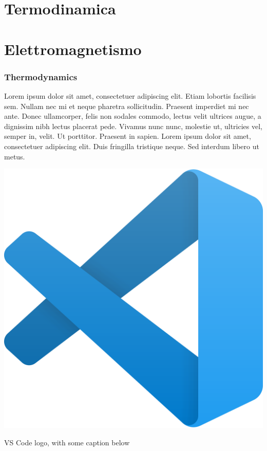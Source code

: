 \documentclass{book}
\begin{document}


\part{Termodinamica}



\part{Elettromagnetismo}








\section{Thermodynamics}
\marginpar{\minitoc}


Lorem ipsum dolor sit amet, consectetuer adipiscing elit. Etiam lobortis facilisis
sem. Nullam nec mi et neque pharetra sollicitudin. Praesent imperdiet mi nec
ante. Donec ullamcorper, felis non sodales commodo, lectus velit ultrices augue,
a dignissim nibh lectus placerat pede. Vivamus nunc nunc, molestie ut, ultricies
vel, semper in, velit. Ut porttitor. Praesent in sapien. Lorem ipsum dolor sit
amet, consectetuer adipiscing elit. Duis fringilla tristique neque. Sed interdum
libero ut metus. 


\begin{marginfigure}
  \centering
  \includegraphics[width = \marginparwidth]{figures/vscode.png}
  \caption{VS Code logo, with some caption below}
\end{marginfigure}
\end{document}
